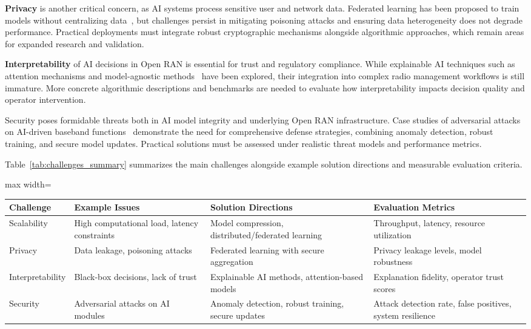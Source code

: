 \documentclass[sigconf]{acmart}
\begin{document}
\textbf{Privacy} is another critical concern, as AI systems process sensitive user and network data. Federated learning has been proposed to train models without centralizing data~\cite{ref2}, but challenges persist in mitigating poisoning attacks and ensuring data heterogeneity does not degrade performance. Practical deployments must integrate robust cryptographic mechanisms alongside algorithmic approaches, which remain areas for expanded research and validation.

\textbf{Interpretability} of AI decisions in Open RAN is essential for trust and regulatory compliance. While explainable AI techniques such as attention mechanisms and model-agnostic methods~\cite{ref3} have been explored, their integration into complex radio management workflows is still immature. More concrete algorithmic descriptions and benchmarks are needed to evaluate how interpretability impacts decision quality and operator intervention.

Security poses formidable threats both in AI model integrity and underlying Open RAN infrastructure. Case studies of adversarial attacks on AI-driven baseband functions~\cite{ref4} demonstrate the need for comprehensive defense strategies, combining anomaly detection, robust training, and secure model updates. Practical solutions must be assessed under realistic threat models and performance metrics.

Table~\ref{tab:challenges_summary} summarizes the main challenges alongside example solution directions and measurable evaluation criteria.

\begin{table*}[htbp]
\centering
\caption{Summary of Key Challenges in AI-Driven Open RAN and Proposed Solution Approaches}
\label{tab:challenges_summary}
\begin{adjustbox}{max width=\textwidth}
\begin{tabular}{@{}llll@{}}
\toprule
\textbf{Challenge} & \textbf{Example Issues} & \textbf{Solution Directions} & \textbf{Evaluation Metrics} \\ \midrule
Scalability & High computational load, latency constraints & Model compression, distributed/federated learning~\cite{ref1} & Throughput, latency, resource utilization \\ 
Privacy & Data leakage, poisoning attacks & Federated learning with secure aggregation~\cite{ref2} & Privacy leakage levels, model robustness \\ 
Interpretability & Black-box decisions, lack of trust & Explainable AI methods, attention-based models~\cite{ref3} & Explanation fidelity, operator trust scores \\ 
Security & Adversarial attacks on AI modules & Anomaly detection, robust training, secure updates~\cite{ref4} & Attack detection rate, false positives, system resilience \\ \bottomrule
\end{tabular}
\end{adjustbox}
\end{table*}
\end{document}
